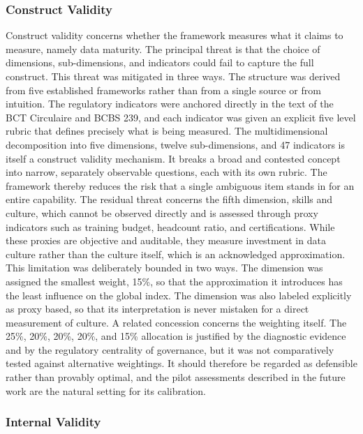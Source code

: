 \subsubsection{Construct Validity}

Construct validity concerns whether the framework measures what it claims to measure, namely data maturity. The principal threat is that the choice of dimensions, sub-dimensions, and indicators could fail to capture the full construct. This threat was mitigated in three ways. The structure was derived from five established frameworks rather than from a single source or from intuition. The regulatory indicators were anchored directly in the text of the BCT Circulaire and BCBS 239, and each indicator was given an explicit five level rubric that defines precisely what is being measured. The multidimensional decomposition into five dimensions, twelve sub-dimensions, and 47 indicators is itself a construct validity mechanism. It breaks a broad and contested concept into narrow, separately observable questions, each with its own rubric. The framework thereby reduces the risk that a single ambiguous item stands in for an entire capability. The residual threat concerns the fifth dimension, skills and culture, which cannot be observed directly and is assessed through proxy indicators such as training budget, headcount ratio, and certifications. While these proxies are objective and auditable, they measure investment in data culture rather than the culture itself, which is an acknowledged approximation. This limitation was deliberately bounded in two ways. The dimension was assigned the smallest weight, 15\%, so that the approximation it introduces has the least influence on the global index. The dimension was also labeled explicitly as proxy based, so that its interpretation is never mistaken for a direct measurement of culture. A related concession concerns the weighting itself. The 25\%, 20\%, 20\%, 20\%, and 15\% allocation is justified by the diagnostic evidence and by the regulatory centrality of governance, but it was not comparatively tested against alternative weightings. It should therefore be regarded as defensible rather than provably optimal, and the pilot assessments described in the future work are the natural setting for its calibration.

\subsubsection{Internal Validity}

